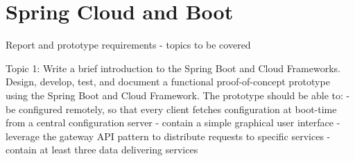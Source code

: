 \chapter{Spring Cloud and Boot}\label{ch:spring}
Report and prototype requirements - topics to be covered

Topic 1: Write a brief introduction to the Spring Boot and Cloud Frameworks. Design, develop, test, and document a functional proof-of-concept prototype using the Spring Boot and Cloud Framework. The prototype should be able to:
- be configured remotely, so that every client fetches configuration at boot-time from a central configuration server
- contain a simple graphical user interface
- leverage the gateway API pattern to distribute requests to specific services
- contain at least three data delivering services 